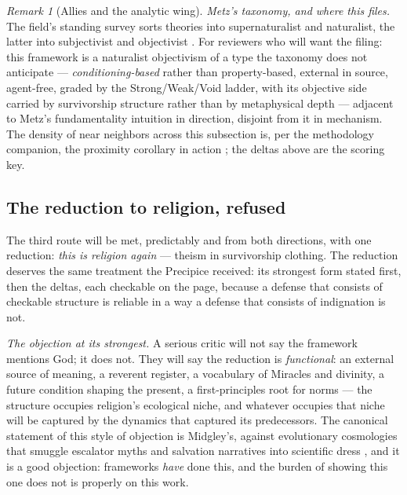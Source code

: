 \documentclass[11pt]{article}
\numberwithin{equation}{section}
\theoremstyle{plain}
\theoremstyle{definition}
\theoremstyle{remark}
\newtheorem{remark}[theorem]{Remark}
\begin{document}
\begin{remark}[Allies and the analytic wing]
\emph{Metz's taxonomy, and where this files.} The field's standing
survey sorts theories into supernaturalist and naturalist, the
latter into subjectivist and objectivist \cite{Metz13}. For
reviewers who will want the filing: this framework is a naturalist
objectivism of a type the taxonomy does not anticipate ---
\emph{conditioning-based} rather than property-based, external in
source, agent-free, graded by the Strong/Weak/Void ladder, with its
objective side carried by survivorship structure rather than by
metaphysical depth --- adjacent to Metz's fundamentality intuition
in direction, disjoint from it in mechanism. The density of near
neighbors across this subsection is, per the methodology companion,
the proximity corollary in action \cite{Ben26Method}; the deltas
above are the scoring key.
\end{remark}

\subsection{The reduction to religion, refused}\label{gs:sub:notreligion}

The third route will be met, predictably and from both directions,
with one reduction: \emph{this is religion again} --- theism in
survivorship clothing. The reduction deserves the same treatment the
Precipice received: its strongest form stated first, then the deltas,
each checkable on the page, because a defense that consists of
checkable structure is reliable in a way a defense that consists of
indignation is not.

\emph{The objection at its strongest.} A serious critic will not say
the framework mentions God; it does not. They will say the reduction
is \emph{functional}: an external source of meaning, a reverent
register, a vocabulary of Miracles and divinity, a future condition
shaping the present, a first-principles root for norms --- the
structure occupies religion's ecological niche, and whatever occupies
that niche will be captured by the dynamics that captured its
predecessors. The canonical statement of this style of objection is
Midgley's, against evolutionary cosmologies that smuggle escalator
myths and salvation narratives into scientific dress
\cite{Midgley85}, and it is a good objection: frameworks \emph{have}
done this, and the burden of showing this one does not is properly
on this work.
\end{document}

